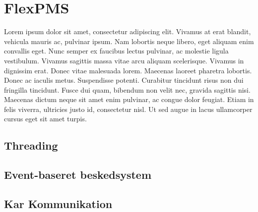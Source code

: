 \section{FlexPMS}
Lorem ipsum dolor sit amet, consectetur adipiscing elit. Vivamus at erat blandit, vehicula mauris ac, pulvinar ipsum. Nam lobortis neque libero, eget aliquam enim convallis eget. Nunc semper ex faucibus lectus pulvinar, ac molestie ligula vestibulum. Vivamus sagittis massa vitae arcu aliquam scelerisque. Vivamus in dignissim erat. Donec vitae malesuada lorem. Maecenas laoreet pharetra lobortis. Donec ac iaculis metus. Suspendisse potenti. Curabitur tincidunt risus non dui fringilla tincidunt. Fusce dui quam, bibendum non velit nec, gravida sagittis nisi. Maecenas dictum neque sit amet enim pulvinar, ac congue dolor feugiat. Etiam in felis viverra, ultricies justo id, consectetur nisl. Ut sed augue in lacus ullamcorper cursus eget sit amet turpis.\\


\subsection{Threading}


\subsection{Event-baseret beskedsystem}


\subsection{Kar Kommunikation}

